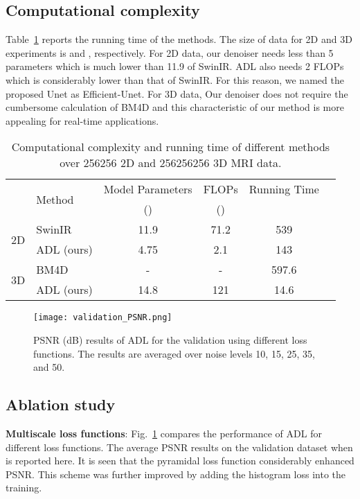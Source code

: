 \documentclass[journal,twoside,web]{ieeecolor}
\begin{document}
\subsection{Computational complexity} Table~\ref{table::runningTime} reports the running time of the methods. The size of data for 2D and 3D experiments is  and , respectively. For 2D data, our denoiser needs less than 5  parameters which is much lower than 11.9 of SwinIR. ADL also needs 2 FLOPs which is considerably lower than that of SwinIR. 
For this reason, we named the proposed Unet as Efficient-Unet. For 3D data, Our denoiser does not require the cumbersome calculation of BM4D and this characteristic of our method is more appealing for real-time applications.
\renewcommand{\tabcolsep}{4pt}\begin{table}\begin{minipage}[h]{1.\linewidth}
    \centering
    \caption{Computational complexity and running time of different methods over 256256 2D and 256256256 3D MRI data.}
    \label{table::runningTime}
    \begin{tabular}{clcccc} 
    \toprule
    &\multirow{2}{*}{Method}
            &{Model Parameters}
                &{FLOPs }
                        &{Running Time }\\
                        &&() & ()& \\
                             \midrule \multirow{2}{*}{2D}&
    \verb//{SwinIR~\cite{liang2021swinir}}&11.9&71.2&539 \\
    &\verb//{ADL (ours)}&4.75&2.1&143 \\
    \midrule
    \multirow{2}{*}{3D}&
    \verb//{BM4D}~\cite{maggioni2012nonlocal}&-&-&597.6  \\
    &\verb//{ADL (ours)}&14.8&121& 14.6 \\
    \bottomrule
    \end{tabular}
    \end{minipage}
    \vspace{0.00mm}
\end{table}


\begin{figure}
\centering
    \texttt{[image: validation\_PSNR.png]}
\caption{PSNR (dB) results of ADL for the validation using different loss functions. The results are averaged over noise levels 10, 15, 25, 35, and 50.}
\label{fig:ablationPSNR}
\end{figure}\subsection{Ablation study}
\textbf{Multiscale loss functions}: Fig.~\ref{fig:ablationPSNR} compares the performance of ADL for different loss functions. The average PSNR results on the validation dataset when 
is reported here. 
It is seen that the pyramidal loss function considerably enhanced PSNR. This scheme was further improved by adding the histogram loss into the training.
\end{document}
